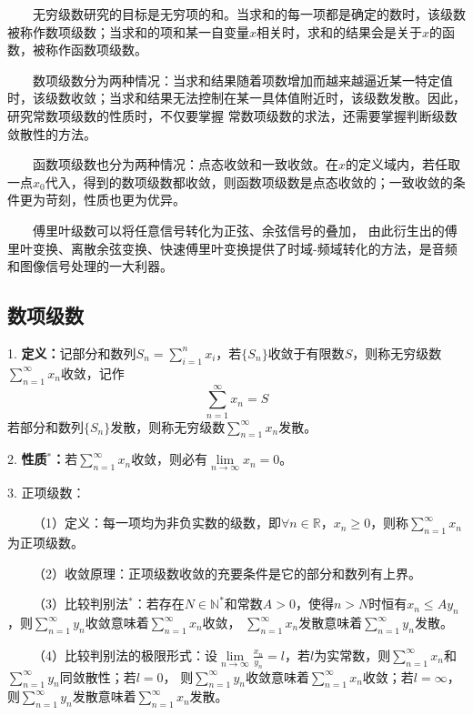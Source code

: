 \begin{tcolorbox}[colback=red!5,colframe=red!75!black]
    ~~~~无穷级数研究的目标是无穷项的和。当求和的每一项都是确定的数时，该级数被称作数项级数；当求和的项和某一自变量$x$相关时，求和的结果会是关于$x$的函数，被称作函数项级数。
    
    ~~~~数项级数分为两种情况：当求和结果随着项数增加而越来越逼近某一特定值时，该级数收敛；当求和结果无法控制在某一具体值附近时，该级数发散。因此，研究常数项级数的性质时，不仅要掌握
    常数项级数的求法，还需要掌握判断级数敛散性的方法。

    ~~~~函数项级数也分为两种情况：点态收敛和一致收敛。在$x$的定义域内，若任取一点$x_0$代入，得到的数项级数都收敛，则函数项级数是点态收敛的；一致收敛的条件更为苛刻，性质也更为优异。

    ~~~~傅里叶级数可以将任意信号转化为正弦、余弦信号的叠加，
    由此衍生出的傅里叶变换、离散余弦变换、快速傅里叶变换提供了时域-频域转化的方法，是音频和图像信号处理的一大利器。

\end{tcolorbox}

\subsection{数项级数}

1. \textbf{定义：}记部分和数列$S_n=\sum\limits_{i=1}^n x_i$，若$\{S_n\}$收敛于有限数$S$，则称无穷级数$\sum\limits_{n=1}^\infty x_n$收敛，记作
\begin{equation*}
    \sum\limits_{n=1}^\infty x_n = S
\end{equation*}
若部分和数列$\{S_n\}$发散，则称无穷级数$\sum\limits_{n=1}^\infty x_n$发散。

2. \textbf{性质$^*$：}若$\sum\limits_{n=1}^\infty x_n$收敛，则必有$\lim\limits_{n\rightarrow\infty} x_n=0$。

3. 正项级数：

~~~~（1）定义：每一项均为非负实数的级数，即$\forall n\in \mathbb{R}$，$x_n \geqslant 0$，则称$\sum\limits_{n=1}^\infty x_n$为正项级数。

~~~~（2）收敛原理：正项级数收敛的充要条件是它的部分和数列有上界。

~~~~（3）比较判别法$^*$：若存在$N\in \mathbb{N}^*$和常数$A>0$，使得$n>N$时恒有$x_n\leqslant A y_n$，则$\sum\limits_{n=1}^\infty y_n$收敛意味着$\sum\limits_{n=1}^\infty x_n$收敛，
$\sum\limits_{n=1}^\infty x_n$发散意味着$\sum\limits_{n=1}^\infty y_n$发散。

~~~~（4）比较判别法的极限形式：设$\lim\limits_{n\rightarrow\infty}\frac{x_n}{y_n}=l$，若$l$为实常数，则$\sum\limits_{n=1}^\infty x_n$和$\sum\limits_{n=1}^\infty y_n$同敛散性；若$l=0$，
则$\sum\limits_{n=1}^\infty y_n$收敛意味着$\sum\limits_{n=1}^\infty x_n$收敛；若$l=\infty$，则$\sum\limits_{n=1}^\infty y_n$发散意味着$\sum\limits_{n=1}^\infty x_n$发散。

